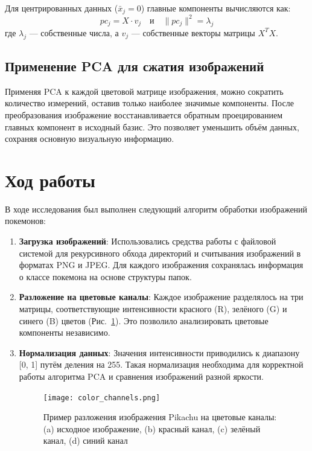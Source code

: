 \documentclass[14pt]{extarticle}
\begin{document}
Для центрированных данных ($\bar{x}_j = 0$) главные компоненты вычисляются как:
\begin{equation*}
pc_j = X \cdot v_j \quad \text{и} \quad \|pc_j\|^2 = \lambda_j
\end{equation*}
где $\lambda_j$ — собственные числа, а $v_j$ — собственные векторы матрицы $X^T X$.

\subsection{Применение PCA для сжатия изображений}
Применяя PCA к каждой цветовой матрице изображения, можно сократить количество измерений, оставив только наиболее значимые компоненты. После преобразования изображение восстанавливается обратным проецированием главных компонент в исходный базис. Это позволяет уменьшить объём данных, сохраняя основную визуальную информацию.

\section{Ход работы}

В ходе исследования был выполнен следующий алгоритм обработки изображений покемонов:

\begin{enumerate}
\item \textbf{Загрузка изображений}: 
Использовались средства работы с файловой системой для рекурсивного обхода директорий и считывания изображений в форматах PNG и JPEG. Для каждого изображения сохранялась информация о классе покемона на основе структуры папок.

\item \textbf{Разложение на цветовые каналы}:
Каждое изображение разделялось на три матрицы, соответствующие интенсивности красного (R), зелёного (G) и синего (B) цветов (Рис.~\ref{fig:color_channels}). Это позволило анализировать цветовые компоненты независимо.

\item \textbf{Нормализация данных}:
Значения интенсивности приводились к диапазону [0, 1] путём деления на 255. Такая нормализация необходима для корректной работы алгоритма PCA и сравнения изображений разной яркости.

\begin{figure}[H]
\centering
\texttt{[image: color\_channels.png]}
\caption{Пример разложения изображения Pikachu на цветовые каналы: (a) исходное изображение, (b) красный канал, (c) зелёный канал, (d) синий канал}
\label{fig:color_channels}
\end{figure}

\end{enumerate}
\end{document}
